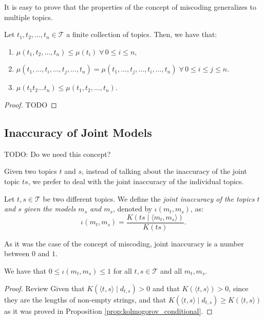 It is easy to prove that the properties of the concept of miscoding generalizes to multiple topics.

\begin{proposition}
Let $t_1, t_2, \ldots, t_n \in \mathcal{T}$ a finite collection of topics. Then, we have that:

\renewcommand{\theenumi}{\roman{enumi}}
\begin{enumerate}
\item $\mu(t_1, t_2, \ldots, t_n) \leq \mu(t_i) \; \forall \, 0 \leq i \leq n$,
\item $\mu(t_1, \ldots, t_i, \ldots, t_j, \ldots, t_n) = \mu(t_1, \ldots, t_j, \ldots, t_i, \ldots, t_n) \; \forall \, 0 \leq i \leq j \leq n$.
\item $\mu(t_1 t_2 \ldots t_n) \leq \mu(t_1, t_2, \ldots, t_n)$.
\end{enumerate}
\end{proposition}
\begin{proof}
{\color{red} TODO}
\end{proof}


\subsection{Inaccuracy of Joint Models}

{\color{red} TODO: Do we need this concept?}

Given two topics $t$ and $s$, instead of talking about the inaccuracy of the joint topic $ts$, we prefer to deal with the joint inaccuracy of the individual topics.

\begin{definition}
Let $t, s \in \mathcal{T}$ be two different topics. We define the \emph{joint inaccuracy of the topics $t$ and $s$ given the models $m_s$ and $m_s$}, denoted by $\iota(m_t, m_s)$, as:
\[
\iota( m_t, m_s ) = \frac{ K(ts \mid  \langle m_t, m_s \rangle ) } {K(ts)}.
\]
\end{definition}

As it was the case of the concept of miscoding, joint inaccuracy is a number between $0$ and $1$.

\begin{proposition}
We have that $0 \leq \iota(m_t, m_s) \leq 1$ for all $t, s \in \mathcal{T}$ and all $m_t, m_s$.
\end{proposition}
\begin{proof}
{\color{red} Review}
Given that $K \left( \langle t, s \rangle \mid d_{t,s} \right)>0$ and that $K \left( \langle t, s \rangle \right)>0$, since they are the lengths of non-empty strings, and that $K \left( \langle t, s \rangle \mid d_{t,s} \right)  \geq K \left( \langle t, s \rangle \right)$ as it was proved in Proposition \ref{prop:kolmogorov_conditional}.
\end{proof}

